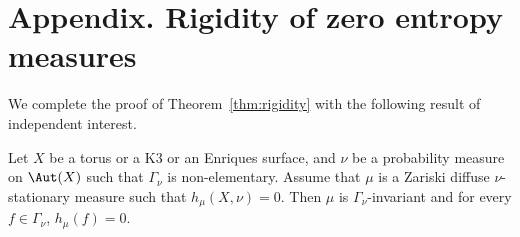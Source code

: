 \appendix
{}\label{app:zero_entropy}
\section*{Appendix. Rigidity of zero entropy measures}

We complete the proof of Theorem~\ref{thm:rigidity} with the following result
of independent interest.\vspace*{-5pt}\enlargethispage{.5\baselineskip}%

\begin{thm}\label{thm:entropy_every_f}
Let $X$ be a torus or a K3 or an Enriques surface,
and $\nu$ be a probability measure on
$\Aut(X)$ such that $\Gamma_\nu$ is non-elementary. Assume that $\mu$ is a Zariski diffuse
$\nu$-stationary measure such that $h_\mu(X, \nu) = 0$.
Then $\mu$ is $\Gamma_\nu$-invariant and for every
$f\in \Gamma_\nu$, $h_\mu(f)=0$.
\end{thm}

